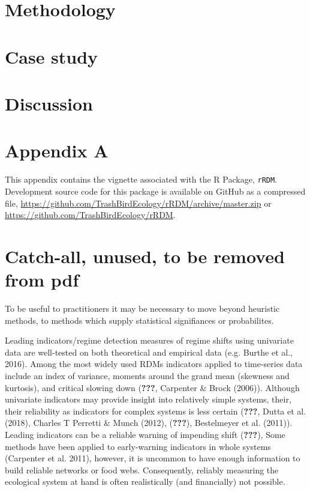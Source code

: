 \documentclass[12pt,twoside,openany]{reedthesis}
\begin{document}
\chapter{Methodology}\label{methodology}

\chapter{Case study}\label{case-study-1}

\chapter{Discussion}\label{discussion-2}

\appendix

\chapter*{Appendix A}\label{rRDM}

This appendix contains the vignette associated with the R Package,
\texttt{rRDM}. Development source code for this package is available on
GitHub as a compressed file,
\url{https://github.com/TrashBirdEcology/rRDM/archive/master.zip} or
\url{https://github.com/TrashBirdEcology/rRDM}.

\chapter*{Catch-all, unused, to be removed from
pdf}\label{catch-all-unused-to-be-removed-from-pdf}

To be useful to practitioners it may be necessary to move beyond
heuristic methods, to methods which supply statistical signifiances or
probabilites.

Leading indicators/regime detection measures of regime shifts using
univariate data are well-tested on both theoretical and empirical data
(e.g. Burthe et al., 2016). Among the most widely used RDMs indicators
applied to time-series data include an index of variance, moments around
the grand mean (skewness and kurtosis), and critical slowing down
({\textbf{???}}, Carpenter \& Brock (2006)). Although univariate
indicators may provide insight into relatively simple systems, their,
their reliability as indicators for complex systems is less certain
({\textbf{???}}, Dutta et al. (2018), Charles T Perretti \& Munch
(2012), ({\textbf{???}}), Bestelmeyer et al. (2011)). Leading indicators
can be a reliable warning of impending shift ({\textbf{???}}), Some
methods have been applied to early-warning indicators in whole systems
(Carpenter et al. 2011), however, it is uncommon to have enough
information to build reliable networks or food webs. Consequently,
reliably measuring the ecological system at hand is often realistically
(and financially) not possible.
\end{document}
